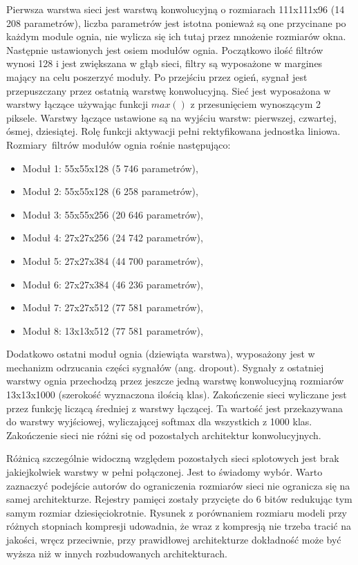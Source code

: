 \documentclass[12pt,a4paper,twoside,titlepage,openright]{book}
\begin{document}
Pierwsza warstwa sieci jest warstwą konwolucyjną o rozmiarach 111x111x96 (14 208 parametrów), liczba parametrów jest istotna ponieważ są one przycinane po każdym module ognia, nie wylicza się ich tutaj przez mnożenie rozmiarów okna. Następnie ustawionych jest osiem modułów ognia. Początkowo ilość filtrów wynosi 128 i jest zwiększana w głąb sieci, filtry są wyposażone w margines mający na celu poszerzyć moduły. Po przejściu przez ogień, sygnał jest przepuszczany przez ostatnią warstwę konwolucyjną. Sieć jest wyposażona w warstwy łączące używając funkcji $max()$ z przesunięciem wynoszącym 2 piksele. Warstwy łączące ustawione są na wyjściu warstw: pierwszej, czwartej, ósmej, dziesiątej. Rolę funkcji aktywacji pełni rektyfikowana jednostka liniowa. Rozmiary filtrów modułów ognia rośnie następująco:
\begin{itemize}
\item Moduł 1: 55x55x128 (5 746 parametrów),
\item Moduł 2: 55x55x128 (6 258 parametrów), 
\item Moduł 3: 55x55x256 (20 646 parametrów),
\item Moduł 4: 27x27x256 (24 742 parametrów),
\item Moduł 5: 27x27x384 (44 700 parametrów),
\item Moduł 6: 27x27x384 (46 236 parametrów),
\item Moduł 7: 27x27x512 (77 581 parametrów),
\item Moduł 8: 13x13x512 (77 581 parametrów),
\end{itemize}
Dodatkowo ostatni moduł ognia (dziewiąta warstwa), wyposażony jest w mechanizm odrzucania części sygnałów (ang. dropout). Sygnały z ostatniej warstwy ognia przechodzą przez jeszcze jedną warstwę konwolucyjną rozmiarów 13x13x1000 (szerokość wyznaczona ilością klas).
Zakończenie sieci wyliczane jest przez funkcję liczącą średniej z warstwy łączącej. Ta wartość jest przekazywana do warstwy wyjściowej, wyliczającej softmax dla wszystkich z 1000 klas. Zakończenie sieci nie różni się od pozostałych architektur konwolucyjnych.

Różnicą szczególnie widoczną względem pozostałych sieci splotowych jest brak jakiejkolwiek warstwy w pełni połączonej. Jest to świadomy wybór. Warto zaznaczyć podejście autorów do ograniczenia rozmiarów sieci nie ogranicza się na samej architekturze. Rejestry pamięci zostały przycięte do 6 bitów redukując tym samym rozmiar dziesięciokrotnie. Rysunek z porównaniem rozmiaru modeli przy różnych stopniach kompresji udowadnia, że wraz z kompresją nie trzeba tracić na jakości, wręcz przeciwnie, przy prawidłowej architekturze dokładność może być wyższa niż w innych rozbudowanych architekturach. \cite{DBLP:journals/corr/IandolaMAHDK16}
\end{document}
